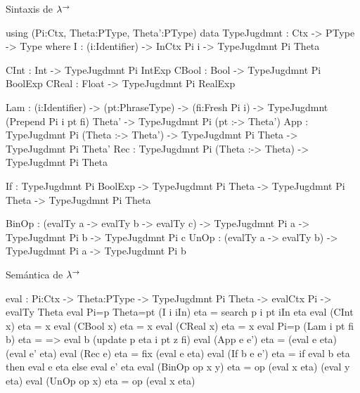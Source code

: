 \noindent
Sintaxis de $\lambda^{\rightarrow}$
\begin{code}
using (Pi:Ctx, Theta:PType, Theta':PType)    
    data TypeJugdmnt : Ctx -> PType -> Type where
        I     : (i:Identifier) -> InCtx Pi i -> TypeJugdmnt Pi Theta
        
        CInt  : Int   -> TypeJugdmnt Pi IntExp
        CBool : Bool  -> TypeJugdmnt Pi BoolExp
        CReal : Float -> TypeJugdmnt Pi RealExp
        
        Lam   : (i:Identifier) -> (pt:PhraseType) -> (fi:Fresh Pi i) ->
                TypeJugdmnt (Prepend Pi i pt fi) Theta' -> 
                TypeJugdmnt Pi (pt :-> Theta')
        App   : TypeJugdmnt Pi (Theta :-> Theta') -> 
                TypeJugdmnt Pi Theta -> TypeJugdmnt Pi Theta'
        Rec   : TypeJugdmnt Pi (Theta :-> Theta) -> TypeJugdmnt Pi Theta
        
        If    : TypeJugdmnt Pi BoolExp -> 
                TypeJugdmnt Pi Theta -> TypeJugdmnt Pi Theta -> 
                TypeJugdmnt Pi Theta
        
        BinOp : (evalTy a -> evalTy b -> evalTy c) -> 
                TypeJugdmnt Pi a -> TypeJugdmnt Pi b -> TypeJugdmnt Pi c
        UnOp  : (evalTy a -> evalTy b) -> 
                TypeJugdmnt Pi a -> TypeJugdmnt Pi b
\end{code}

\noindent
Sem\'antica de $\lambda^{\rightarrow}$
\begin{code}
eval : {Pi:Ctx} -> {Theta:PType} -> TypeJugdmnt Pi Theta -> evalCtx Pi -> evalTy Theta
eval {Pi=p} {Theta=pt} (I i iIn) eta = search p i pt iIn eta
eval (CInt x) eta = x
eval (CBool x) eta = x
eval (CReal x) eta = x
eval {Pi=p} (Lam i pt fi b) eta = \z => eval b (update p eta i pt z fi)
eval (App e e')   eta = (eval e eta) (eval e' eta)
eval (Rec e) eta = fix (eval e eta)
eval (If b e e')  eta = if eval b eta then eval e eta else eval e' eta
eval (BinOp op x y) eta = op (eval x eta) (eval y eta)
eval (UnOp op x) eta = op (eval x eta)
\end{code}
